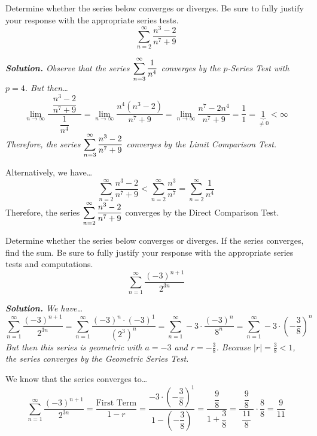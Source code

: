 \documentclass[12pt,letterpaper]{exam}
\begin{document}
\begin{questions}
\newpage
\question[10] Determine whether the series below converges or diverges. Be sure to fully justify your response with the appropriate series tests.
	\[
	\sum_{n=2}^\infty \dfrac{n^3 - 2}{n^7 + 9}
	\] \pspace

{\itshape \textbf{Solution.} Observe that the series $\displaystyle\sum_{n=3}^\infty \dfrac{1}{n^4}$ converges by the $p$-Series Test with $p= 4$. But then\dots
	\[
	\lim_{n \to \infty} \dfrac{\;\;\dfrac{n^3 - 2}{n^7 + 9}\;\;}{\dfrac{1}{n^4}}= \lim_{n \to \infty} \dfrac{n^4(n^3 - 2)}{n^7 + 9}= \lim_{n \to \infty} \dfrac{n^7 - 2n^4}{n^7 + 9}= \dfrac{1}{1}= \underbrace{1}_{\neq 0} < \infty
	\]
Therefore, the series $\displaystyle\sum_{n=3}^\infty \dfrac{n^3 - 2}{n^7 + 9}$ converges by the Limit Comparison Test. \pspace

Alternatively, we have\dots
	\[
	\sum_{n=2}^\infty \dfrac{n^3 - 2}{n^7 + 9} < \sum_{n=2}^\infty \dfrac{n^3}{n^7}= \sum_{n=2}^\infty \dfrac{1}{n^4}
	\]
Therefore, the series $\displaystyle\sum_{n=2}^\infty \dfrac{n^3 - 2}{n^7 + 9}$ converges by the Direct Comparison Test.}



\newpage
\question[10] Determine whether the series below converges or diverges. If the series converges, find the sum. Be sure to fully justify your response with the appropriate series tests and computations. 
	\[
	\sum_{n=1}^\infty \dfrac{(-3)^{n + 1}}{2^{3n}}
	\] \pspace

{\itshape \textbf{Solution.} We have\dots
	\[
	\sum_{n=1}^\infty \dfrac{(-3)^{n+1}}{2^{3n}}= \sum_{n=1}^\infty \dfrac{(-3)^n \cdot (-3)^{1}}{(2^3)^n}= \sum_{n=1}^\infty -3 \cdot \dfrac{(-3)^n}{8^n}= \sum_{n=1}^\infty -3 \cdot \left( -\dfrac{3}{8} \right)^n
	\]
But then this series is geometric with $a= -3$ and $r= -\frac{3}{8}$. Because $|r|= \frac{3}{8} < 1$, the series converges by the Geometric Series Test. \pspace

We know that the series converges to\dots
	\[
	\sum_{n=1}^\infty \dfrac{(-3)^{n+1}}{2^{3n}}= \dfrac{\text{First Term}}{1 - r}= \dfrac{-3 \cdot \left( -\dfrac{3}{8} \right)^1}{1 - \left(-\dfrac{3}{8}\right)}= \dfrac{\;\;\dfrac{9}{8}\;\;}{1 + \dfrac{3}{8}}= \dfrac{\;\;\dfrac{9}{8}\;\;}{\dfrac{11}{8}} \cdot \dfrac{8}{8}= \dfrac{9}{11}
	\] \pspace

}
\end{questions}
\end{document}
